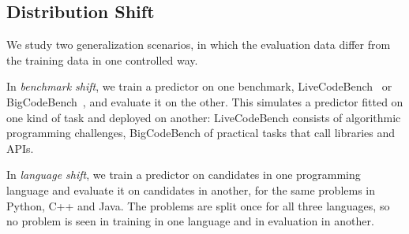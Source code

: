 \subsection{Distribution Shift}
\label{sec:problem-shift}
We study two
generalization scenarios, in which the evaluation data differ from the
training data in one controlled way.

In \emph{benchmark shift}, we train a predictor on one benchmark,
LiveCodeBench~\cite{Jain2025Livecodebench} or
BigCodeBench~\cite{Zhuo2025BCB}, and evaluate it on the other. This simulates
a predictor fitted on one kind of task and deployed on another:
LiveCodeBench consists of algorithmic programming challenges, BigCodeBench of
practical tasks that call libraries and APIs.

In \emph{language shift}, we train a predictor on candidates in one
programming language and evaluate it on candidates in another, for the same
problems in Python, C++ and Java. The problems are split once for all three
languages, so no problem is seen in training in one language and in
evaluation in another. 

